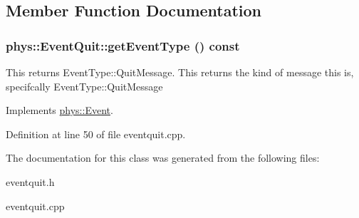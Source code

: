 \subsection{Member Function Documentation}
\hypertarget{classphys_1_1EventQuit_a4df44098d0ef838db55a8e2a016d0724}{
\subsubsection[{getEventType}]{ phys::EventQuit::getEventType () const}}
\label{dd/dea/classphys_1_1EventQuit_a4df44098d0ef838db55a8e2a016d0724}


This returns EventType::QuitMessage. This returns the kind of message this is, specifcally EventType::QuitMessage 

Implements \hyperlink{classphys_1_1Event_ac2c0623a6bc399e62f4b9fb2c022ea73}{phys::Event}.

Definition at line 50 of file eventquit.cpp.

The documentation for this class was generated from the following files:\begin{DoxyCompactItemize}
\item 
eventquit.h\item 
eventquit.cpp\end{DoxyCompactItemize}

